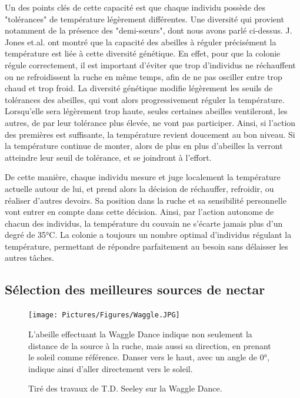 			Un des points clés de cette capacité est que chaque individu possède des "tolérances" de température légèrement différentes. Une diversité qui provient notamment de la présence des "demi-sœurs", dont nous avons parlé ci-dessus. J. Jones et.al. \cite{jones_honey_2004} ont montré que la capacité des abeilles à réguler précisément la température est liée à cette diversité génétique. En effet, pour que la colonie régule correctement, il est important d'éviter que trop d'individus ne réchauffent ou ne refroidissent la ruche en même temps, afin de ne pas osciller entre trop chaud et trop froid. La diversité génétique modifie légèrement les seuils de tolérances des abeilles, qui vont alors progressivement réguler la température. Lorsqu'elle sera légèrement trop haute, seules certaines abeilles ventileront, les autres, de par leur tolérance plus élevée, ne vont pas participer. Ainsi, si l'action des premières est suffisante, la température revient doucement au bon niveau. Si la température continue de monter, alors de plus en plus d'abeilles la verront atteindre leur seuil de tolérance, et se joindront à l'effort.
			
			De cette manière, chaque individu mesure et juge localement la température actuelle autour de lui, et prend alors la décision de réchauffer, refroidir, ou réaliser d'autres devoirs. Sa position dans la ruche et sa sensibilité personnelle vont entrer en compte dans cette décision. Ainsi, par l'action autonome de chacun des individus, la température du couvain ne s'écarte jamais plus d'un degré de 35°C. La colonie a toujours un nombre optimal d'individus régulant la température, permettant de répondre parfaitement au besoin sans délaisser les autres tâches.
			
			\subsection{Sélection des meilleures sources de nectar}
			
			\begin{figure}
			\centering
			\texttt{[image: Pictures/Figures/Waggle.JPG]}
				\caption{Tiré des travaux de T.D. Seeley \cite{seeley_wisdom_1995} sur la Waggle Dance.}{ L'abeille effectuant la Waggle Dance indique non seulement la distance de la source à la ruche, mais aussi sa direction, en prenant le soleil comme référence. Danser vers le haut, avec un angle de 0°, indique ainsi d'aller directement vers le soleil.}
			\label{Waggle}
			\end{figure}
			
